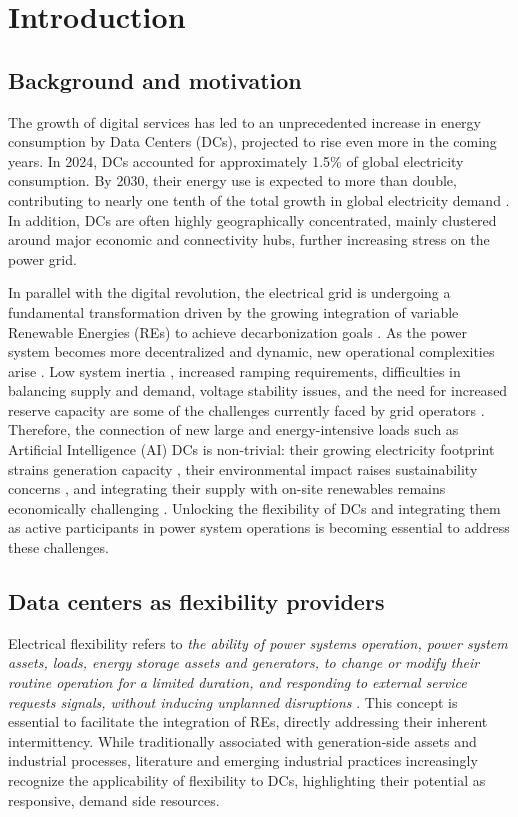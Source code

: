 \documentclass[preprint,12pt]{elsarticle}
\begin{document}
\section{Introduction}
\subsection{Background and motivation}
The growth of digital services has led to an unprecedented increase in energy consumption by Data Centers (DCs), projected to rise even more in the coming years. In 2024, DCs accounted for approximately 1.5\% of global electricity consumption. By 2030, their energy use is expected to more than double, contributing to nearly one tenth of the total growth in global electricity demand \cite{iea2025energyai}. In addition, DCs are often highly geographically concentrated, mainly clustered around major economic and connectivity hubs, further increasing stress on the power grid. 

In parallel with the digital revolution, the electrical grid is undergoing a fundamental transformation driven by the growing integration of variable Renewable Energies (REs) to achieve decarbonization goals \cite{Shair2021}. As the power system becomes more decentralized and dynamic, new operational complexities arise \cite{Caballero-Pea2022}. Low system inertia \cite{Zhang2025}, increased ramping requirements, difficulties in balancing supply and demand, voltage stability issues, and the need for increased reserve capacity are some of the challenges currently faced by grid operators \cite{Purkait2024}. Therefore, the connection of new large and energy-intensive loads such as Artificial Intelligence (AI) DCs is non-trivial: their growing electricity footprint strains generation capacity \cite{Jones2018}, their environmental impact raises sustainability concerns \cite{AlKez2022}, and integrating their supply with on-site renewables remains economically challenging \cite{Gnibga2024}. Unlocking the flexibility of DCs and integrating them as active participants in power system operations is becoming essential to address these challenges.
\subsection{Data centers as flexibility providers}
Electrical flexibility refers to \textit{the ability of power systems operation, power system assets, loads, energy storage assets and generators, to change or modify their routine operation for a limited duration, and responding to external service requests signals, without inducing unplanned disruptions} \cite{Degefa2021}. This concept is essential to facilitate the integration of REs, directly addressing their inherent intermittency. While traditionally associated with generation-side assets and industrial processes, literature \cite{Takci2025, crozier2025potential} and emerging industrial practices \cite{Radovanovic2023} increasingly recognize the applicability of flexibility to DCs, highlighting their potential as responsive, demand side resources.
\end{document}
